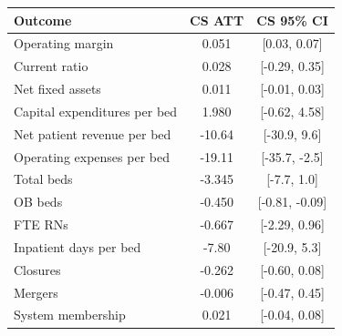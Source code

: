\begin{tabular}{lcc}
\toprule
Outcome & CS ATT & CS 95\% CI \\
\midrule
Operating margin & 0.051 & [0.03, 0.07] \\
Current ratio & 0.028 & [-0.29, 0.35] \\
Net fixed assets & 0.011 & [-0.01, 0.03] \\
Capital expenditures per bed & 1.980 & [-0.62, 4.58] \\
Net patient revenue per bed & -10.64 & [-30.9, 9.6] \\
Operating expenses per bed & -19.11 & [-35.7, -2.5] \\
\addlinespace
Total beds & -3.345 & [-7.7, 1.0] \\
OB beds & -0.450 & [-0.81, -0.09] \\
FTE RNs & -0.667 & [-2.29, 0.96] \\
Inpatient days per bed & -7.80 & [-20.9, 5.3] \\
\addlinespace
Closures & -0.262 & [-0.60, 0.08] \\
Mergers & -0.006 & [-0.47, 0.45] \\
System membership & 0.021 & [-0.04, 0.08] \\
\bottomrule
\end{tabular}
